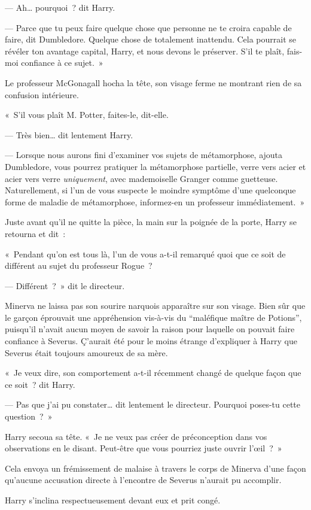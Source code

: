 --- Ah… pourquoi~? dit Harry.

--- Parce que tu peux faire quelque chose que personne ne te croira capable de faire, dit Dumbledore. Quelque chose de totalement inattendu. Cela pourrait se révéler ton avantage capital, Harry, et nous devons le préserver. S'il te plaît, fais-moi confiance à ce sujet.~»

Le professeur McGonagall hocha la tête, son visage ferme ne montrant rien de sa confusion intérieure.

«~S'il vous plaît M. Potter, faites-le, dit-elle.

--- Très bien… dit lentement Harry.

--- Lorsque nous aurons fini d'examiner vos sujets de métamorphose, ajouta Dumbledore, vous pourrez pratiquer la métamorphose partielle, verre vers acier et acier vers verre \emph{uniquement}, avec mademoiselle Granger comme guetteuse. Naturellement, si l'un de vous suspecte le moindre symptôme d'une quelconque forme de maladie de métamorphose, informez-en un professeur immédiatement.~»

Juste avant qu'il ne quitte la pièce, la main sur la poignée de la porte, Harry se retourna et dit~:

«~Pendant qu'on est tous là, l'un de vous a-t-il remarqué quoi que ce soit de différent au sujet du professeur Rogue~?

--- Différent~?~» dit le directeur.

Minerva ne laissa pas son sourire narquois apparaître sur son visage. Bien sûr que le garçon éprouvait une appréhension vis-à-vis du “maléfique maître de Potions”, puisqu'il n'avait aucun moyen de savoir la raison pour laquelle on pouvait faire confiance à Severus. Ç'aurait été pour le moins étrange d'expliquer à Harry que Severus était toujours amoureux de sa mère.

«~Je veux dire, son comportement a-t-il récemment changé de quelque façon que ce soit~? dit Harry.

--- Pas que j'ai pu constater… dit lentement le directeur. Pourquoi poses-tu cette question~?~»

Harry secoua sa tête. «~Je ne veux pas créer de préconception dans vos observations en le disant. Peut-être que vous pourriez juste ouvrir l'œil~?~»

Cela envoya un frémissement de malaise à travers le corps de Minerva d'une façon qu'aucune accusation directe à l'encontre de Severus n'aurait pu accomplir.

Harry s'inclina respectueusement devant eux et prit congé.

